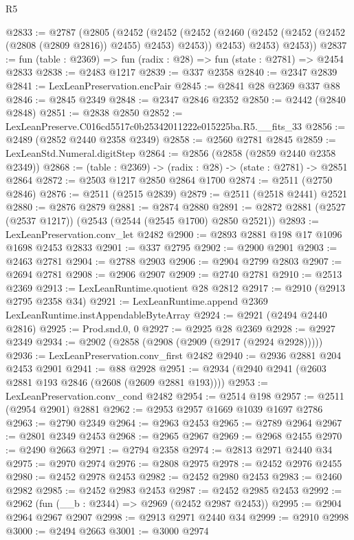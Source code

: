 \begin{lexlean}{R5}
\begin{coremodule}
@2833 := @2787
    (@2805
      (@2452
        (@2452
          (@2452 (@2460 (@2452 (@2452 (@2452 (@2808 (@2809 @2816)) @2455) @2453) @2453)) @2453)
          @2453)
        @2453))
@2837 := fun (table : @2369) => fun (radix : @28) => fun (state : @2781) => @2454 @2833
@2838 := @2483 @1217
@2839 := @337 @2358
@2840 := @2347 @2839
@2841 := LexLeanPreservation.encPair
@2845 := @2841 @28 @2369 @337 @88
@2846 := @2845 @2349
@2848 := @2347 @2846 @2352
@2850 := @2442 (@2840 @2848)
@2851 := @2838 @2850
@2852 := LexLeanPreserve.C016cd5517c0b25342011222e015225ba.R5.__fits_33
@2856 := @2489 (@2852 @2440 @2358 @2349)
@2858 := @2560 @2781 @2845
@2859 := LexLeanStd.Numeral.digitStep
@2864 := @2856 (@2858 (@2859 @2440 @2358 @2349))
@2868 := (table : @2369) -> (radix : @28) -> (state : @2781) -> @2851 @2864
@2872 := @2503 @1217 @2850 @2864 @1700
@2874 := @2511 (@2750 @2846)
@2876 := @2511 (@2515 @2839)
@2879 := @2511 (@2518 @2441) @2521
@2880 := @2876 @2879
@2881 := @2874 @2880
@2891 := @2872 @2881 (@2527 (@2537 @1217)) (@2543 (@2544 (@2545 @1700) @2850 @2521))
@2893 := LexLeanPreservation.conv_let @2482
@2900 := @2893 @2881 @198 @17 @1096 @1698 @2453 @2833
@2901 := @337 @2795
@2902 := @2900 @2901
@2903 := @2463 @2781
@2904 := @2788 @2903
@2906 := @2904 @2799 @2803
@2907 := @2694 @2781
@2908 := @2906 @2907
@2909 := @2740 @2781
@2910 := @2513 @2369
@2913 := LexLeanRuntime.quotient @28 @2812
@2917 := @2910 (@2913 @2795 @2358 @34)
@2921 := LexLeanRuntime.append @2369 LexLeanRuntime.instAppendableByteArray
@2924 := @2921 (@2494 @2440 @2816)
@2925 := Prod.snd.{0, 0}
@2927 := @2925 @28 @2369
@2928 := @2927 @2349
@2934 := @2902 (@2858 (@2908 (@2909 (@2917 (@2924 @2928)))))
@2936 := LexLeanPreservation.conv_first @2482
@2940 := @2936 @2881 @204 @2453 @2901
@2941 := @88 @2928
@2951 := @2934 (@2940 @2941 (@2603 @2881 @193 @2846 (@2608 (@2609 @2881 @193))))
@2953 := LexLeanPreservation.conv_cond @2482
@2954 := @2514 @198
@2957 := @2511 (@2954 @2901) @2881
@2962 := @2953 @2957 @1669 @1039 @1697 @2786
@2963 := @2790 @2349
@2964 := @2963 @2453
@2965 := @2789 @2964
@2967 := @2801 @2349 @2453
@2968 := @2965 @2967
@2969 := @2968 @2455
@2970 := @2490 @2663
@2971 := @2794 @2358
@2974 := @2813 @2971 @2440 @34
@2975 := @2970 @2974
@2976 := @2808 @2975
@2978 := @2452 @2976 @2455
@2980 := @2452 @2978 @2453
@2982 := @2452 @2980 @2453
@2983 := @2460 @2982
@2985 := @2452 @2983 @2453
@2987 := @2452 @2985 @2453
@2992 := @2962 (fun (__b : @2344) => @2969 (@2452 @2987 @2453))
@2995 := @2904 @2964 @2967 @2907
@2998 := @2913 @2971 @2440 @34
@2999 := @2910 @2998
@3000 := @2494 @2663
@3001 := @3000 @2974

\end{coremodule}
\end{lexlean}
